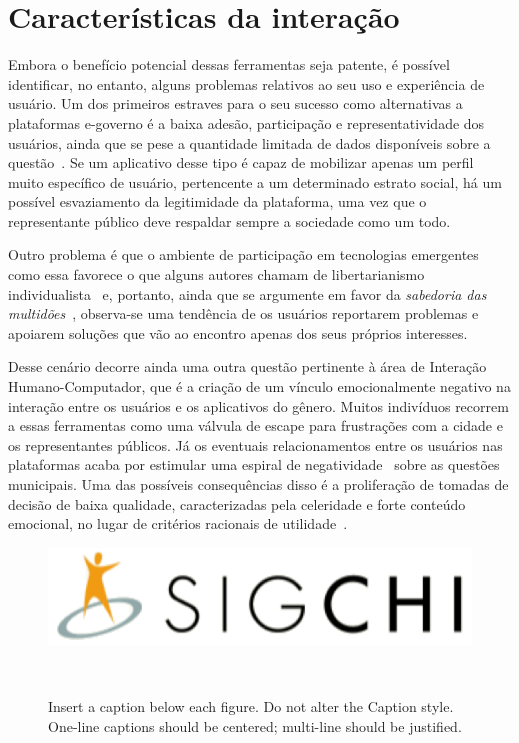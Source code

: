 \documentclass{sigchi}
\begin{document}
\section{Características da interação}
Embora o benefício potencial dessas ferramentas seja patente, é possível identificar, no entanto, alguns problemas relativos ao seu uso e experiência de usuário. Um dos primeiros estraves para o seu sucesso como alternativas a plataformas e-governo é a baixa adesão, participação e representatividade dos usuários, ainda que se pese a quantidade limitada de dados disponíveis sobre a questão~\cite{colab_recife:2016}. Se um aplicativo desse tipo é capaz de mobilizar apenas um perfil muito específico de usuário, pertencente a um determinado estrato social, há um possível esvaziamento da legitimidade da plataforma, uma vez que o representante público deve respaldar sempre a sociedade como um todo.

Outro problema é que o ambiente de participação em tecnologias emergentes como essa favorece o que alguns autores chamam de libertarianismo individualista~\cite{brabham:2008} e, portanto, ainda que se argumente em favor da \textit{sabedoria das multidões}~\cite{surowiecki:2005}, observa-se uma tendência de os usuários reportarem problemas e apoiarem soluções que vão ao encontro apenas dos seus próprios interesses.

Desse cenário decorre ainda uma outra questão pertinente à área de Interação Humano-Computador, que é a criação de um vínculo emocionalmente negativo na interação entre os usuários e os aplicativos do gênero. Muitos indivíduos recorrem a essas ferramentas como uma válvula de escape para frustrações com a cidade e os representantes públicos. Já os eventuais relacionamentos entre os usuários nas plataformas acaba por estimular uma espiral de negatividade~\cite{slater:2007} sobre as questões municipais. Uma das possíveis consequências disso é a proliferação de tomadas de decisão de baixa qualidade, caracterizadas pela celeridade e forte conteúdo emocional, no lugar de critérios racionais de utilidade~\cite{tversky:1986}.

\begin{figure}
\centering
  \includegraphics[width=0.9\columnwidth]{figures/sigchi-logo}
  \caption{Insert a caption below each figure. Do not alter the
    Caption style.  One-line captions should be centered; multi-line
    should be justified. }~\label{fig:figure1}
\end{figure}
\end{document}
